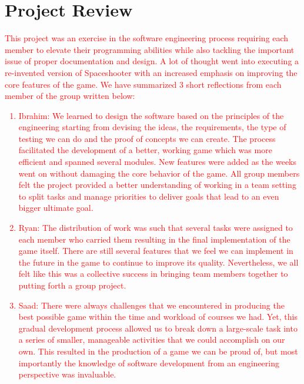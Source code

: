 \documentclass{article}
\begin{document}
\section{Project Review}
\textcolor{red}{This project was an exercise in the software engineering process requiring each member to elevate their programming abilities while also tackling the important issue of proper documentation and design. A lot of thought went into executing a re-invented version of Spaceshooter with an increased emphasis on improving the core features of the game. We have summarized 3 short reflections from each member of the group written below:
\begin{enumerate}
\item{Ibrahim: }We learned to design the software based on the principles of the engineering starting from devising the ideas, the requirements, the type of testing we can do and the proof of concepts we can create. The process facilitated the development of a better, working game which was more efficient and spanned several modules. New features were added as the weeks went on without damaging the core behavior of the game. All group members felt the project provided a better understanding of working in a team setting to split tasks and manage priorities to deliver goals that lead to an even bigger ultimate goal.
\item{Ryan:} The distribution of work was such that several tasks were assigned to each member who carried them resulting in the final implementation of the game itself. There are still several features that we feel we can implement in the future in the game to continue to improve its quality. Nevertheless, we all felt like this was a collective success in bringing team members together to putting forth a group project. 
\item{Saad:} There were always challenges that we encountered in producing the best possible game within the time and workload of courses we had. Yet, this gradual development process allowed us to break down a large-scale task into a series of smaller, manageable activities that we could accomplish on our own. This resulted in the production of a game we can be proud of, but most importantly the knowledge of software development from an engineering perspective was invaluable. 
\end{enumerate}}
\end{document}
